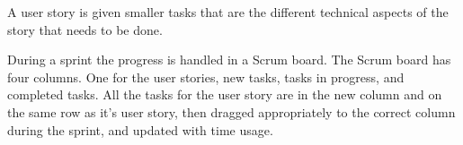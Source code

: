 A user story is given smaller tasks that are the different technical aspects of the story that needs to be done.

During a sprint the progress is handled in a Scrum board. The Scrum board has four columns. One for the user stories, new tasks, tasks in progress, and completed tasks.
All the tasks for the user story are in the new column and on the same row as it's user story, then dragged appropriately to the correct column during the sprint, and updated with time usage.
